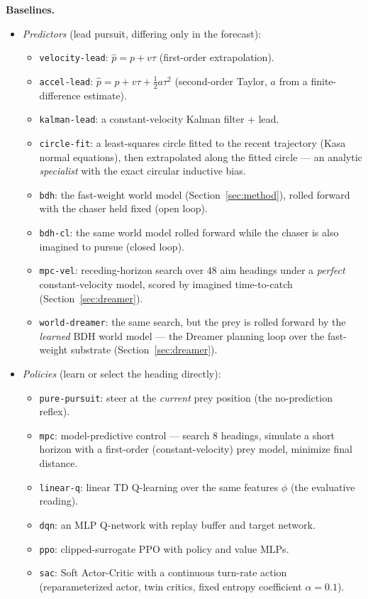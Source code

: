 \documentclass[11pt]{article}
\begin{document}
\textbf{Baselines.}
\begin{itemize}
\item \emph{Predictors} (lead pursuit, differing only in the forecast):
  \begin{itemize}
  \item \texttt{velocity-lead}: $\hat p = p + v\tau$ (first-order extrapolation).
  \item \texttt{accel-lead}: $\hat p = p + v\tau + \tfrac12 a \tau^2$ (second-order Taylor,
    $a$ from a finite-difference estimate).
  \item \texttt{kalman-lead}: a constant-velocity Kalman filter + lead.
  \item \texttt{circle-fit}: a least-squares circle fitted to the recent trajectory (Kasa
    normal equations), then extrapolated along the fitted circle --- an analytic
    \emph{specialist} with the exact circular inductive bias.
  \item \texttt{bdh}: the fast-weight world model (Section~\ref{sec:method}), rolled forward
    with the chaser held fixed (open loop).
  \item \texttt{bdh-cl}: the same world model rolled forward while the chaser is also imagined
    to pursue (closed loop).
  \item \texttt{mpc-vel}: receding-horizon search over $48$ aim headings under a \emph{perfect}
    constant-velocity model, scored by imagined time-to-catch (Section~\ref{sec:dreamer}).
  \item \texttt{world-dreamer}: the same search, but the prey is rolled forward by the
    \emph{learned} BDH world model --- the Dreamer planning loop over the fast-weight substrate
    (Section~\ref{sec:dreamer}).
  \end{itemize}
\item \emph{Policies} (learn or select the heading directly):
  \begin{itemize}
  \item \texttt{pure-pursuit}: steer at the \emph{current} prey position (the no-prediction
    reflex).
  \item \texttt{mpc}: model-predictive control --- search $8$ headings, simulate a short
    horizon with a first-order (constant-velocity) prey model, minimize final distance.
  \item \texttt{linear-q}: linear TD Q-learning over the same features $\phi$ (the evaluative
    reading).
  \item \texttt{dqn}: an MLP Q-network with replay buffer and target network.
  \item \texttt{ppo}: clipped-surrogate PPO with policy and value MLPs.
  \item \texttt{sac}: Soft Actor-Critic \cite{haarnoja2018} with a continuous turn-rate action
    (reparameterized actor, twin critics, fixed entropy coefficient $\alpha = 0.1$).
  \end{itemize}
\end{itemize}
\end{document}
